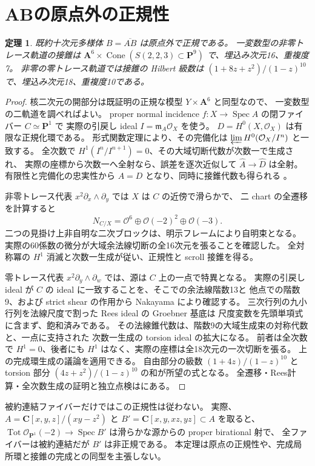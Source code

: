 \documentclass[11pt,a4paper]{ltjsarticle}
\newcommand{\CC}{\mathbf C}
\newcommand{\PP}{\mathbf P}
\renewcommand{\AA}{\mathbf A}
\DeclareMathOperator{\Spec}{Spec}
\newtheorem{theorem}{定理}[section]
\theoremstyle{remark}
\begin{document}
\section{ABの原点外の正規性}
\begin{theorem}\label{thm:ab-punctured-normal-v35}
既約十次元多様体 $B=\overline{AB}$ は原点外で正規である。
一変数型の非零トレース軌道の接錐は
$\AA^6\times\operatorname{Cone}(S(2,2,3)\subset\PP^9)$ で、埋込み次元16、重複度7。
非零の零トレース軌道では接錐の Hilbert 級数は
$(1+8z+z^2)/(1-z)^{10}$ で、埋込み次元18、重複度10である。
\end{theorem}
\begin{proof}
核二次元の開部分は既証明の正規な模型 $Y\times\AA^6$ と同型なので、
一変数型の二軌道を調べればよい。
proper normal incidence $f:X\to\Spec A$ の閉ファイバー $C\simeq\PP^1$ で
実際の引戻し ideal $I=\mathfrak m_A\mathcal O_X$ を使う。
$D=H^0(X,\mathcal O_X)$ は有限な正規化環である。
形式関数定理により、その完備化は $\varprojlim H^0(\mathcal O_X/I^n)$ と一致する。
全次数で $H^1(I^n/I^{n+1})=0$、その大域切断代数が次数一で生成され、
実際の座標から次数一へ全射なら、誤差を逐次近似して $\widehat A\to\widehat D$ は全射。
有限性と完備化の忠実性から $A=D$ となり、同時に接錐代数も得られる
\cite{stacks-stein-v35,stacks-formal-v35}。

非零トレース代表 $x^2\partial_x\wedge\partial_y$ では $X$ は $C$ の近傍で滑らかで、
二 chart の全遷移を計算すると
\[
 N_{C/X}=\mathcal O^6\oplus\mathcal O(-2)^2\oplus\mathcal O(-3).
\]
二つの見掛け上非自明な二次ブロックは、明示フレームにより自明束となる。
実際の60係数の微分が大域余法線切断の全16次元を張ることを確認した。
全対称冪の $H^1$ 消滅と次数一生成が従い、正規性と scroll 接錐を得る。

零トレース代表 $x^2\partial_y\wedge\partial_w$ では、源は $C$ 上の一点で特異となる。
実際の引戻し ideal が $C$ の ideal に一致することを、そこでの余法線階数13と
他点での階数9、および strict shear の作用から Nakayama により確認する。
三次行列の九小行列を法線尺度で割った Rees ideal の Groebner 基底は
尺度変数を先頭単項式に含まず、飽和済みである。
その法線錐代数は、階数9の大域生成束の対称代数と、一点に支持された
次数一生成の torsion ideal の拡大になる。
前者は全次数で $H^1=0$、後者にも $H^1$ はなく、実際の座標は全18次元の一次切断を張る。
上の完成環生成の議論を適用できる。
自由部分の級数 $(1+4z)/(1-z)^{10}$ と torsion 部分
$(4z+z^2)/(1-z)^{10}$ の和が所望の式となる。
全遷移・Rees計算・全次数生成の証明と独立点検は\cite{ab-local-v35}にある。
\end{proof}
被約連結ファイバーだけではこの正規性は従わない。
実際、$A=\CC[x,y,z]/(xy-z^2)$ と $B'=\CC[x,y,xz,yz]\subset A$ を取ると、
$\operatorname{Tot}\mathcal O_{\PP^1}(-2)\to\Spec B'$ は滑らかな源からの proper birational 射で、
全ファイバーは被約連結だが $B'$ は非正規である\cite{normality-counterexample-v35}。
本定理は原点の正規性や、完成局所環と接錐の完成との同型を主張しない。
\end{document}
